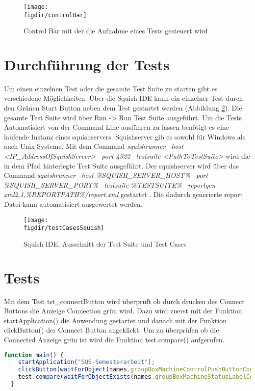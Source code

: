 		\begin{figure}[t]		
			\centering
			\texttt{[image: \\figdir/controlBar]}
			
			\caption[Squish IDE]
			{Control Bar mit der die Aufnahme eines Tests gesteuert wird}
			\label{FIG:controlBar}
		\end{figure}
		\FloatBarrier
		
		\section{Durchführung der Tests}
		\paragraph{} Um einen einzelnen Test oder die gesamte Test Suite zu starten gibt es verschiedene Möglichkeiten. Über die Squish IDE kann ein einzelner Test durch den Grünen Start Button neben dem Test gestartet werden (Abbildung \ref{FIG:testCasesSquish}). Die gesamte Test Suite wird über Run -> Run Test Suite ausgeführt. Um die Tests Automatisiert von der Command Line ausführen zu lassen benötigt es eine laufende Instanz eines squishservers. Squishserver gib es sowohl für Windows als auch Unix Systeme. Mit dem Command \textit{squishrunner --host <IP\_AddressOfSquishServer> --port 4322 --testsuite <PathToTestSuite>} wird die in dem Pfad hinterlegte Test Suite ausgeführt. Der squishserver wird über das Command \textit{squishrunner --host \%SQUISH\_SERVER\_HOST\% --port \%SQUISH\_SERVER\_PORT\% --testsuite \%TESTSUITE\% --reportgen xml2.1,\%REPORTPATH\%/report.xml} gestartet \cite{SquishCLI}. Die dadurch generierte report Datei kann automatisiert ausgewertet werden.
		
		\begin{figure}[t]		
			\centering
			\texttt{[image: \\figdir/testCasesSquish]}
		
			\caption[Squish IDE]
			{Squish IDE, Ausschnitt der Test Suite und Test Cases}
			\label{FIG:testCasesSquish}
		\end{figure}
		\FloatBarrier
		
		\section{Tests}
		Mit dem Test tst\_connectButton wird überprüft ob durch drücken des Connect Buttons die Anzeige Connection grün wird. Dazu wird zuerst mit der Funktion startApplication() die Anwendung gestartet und danach mit der Funktion clickButton() der Connect Button angeklickt. Um zu überprüfen ob die Connected Anzeige grün ist wird die Funktion test.compare() aufgerufen.
		\begin{lstlisting}[language=JavaScript, caption=tst\_connectButton]
  function main() {
    startApplication("SQS-Semesterarbeit");
    clickButton(waitForObject(names.groupBoxMachineControlPushButtonConnectQPushButton));
    test.compare(waitForObjectExists(names.groupBoxMachineStatusLabelConnectionStatusQLabel).styleSheet, "border-radius: 6px; background-color: rgb(27, 193, 00)");
  }
		\end{lstlisting}
		

